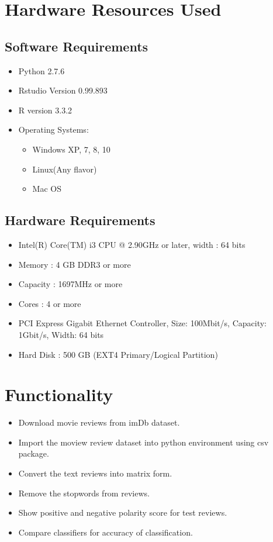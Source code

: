 \documentclass[oneside,a4paper,12pt]{pictreport}
\begin{document}
\section{Hardware Resources Used}
\subsection{Software Requirements}
\begin{itemize}
				\item Python 2.7.6 
				\item Rstudio Version 0.99.893 
				\item R version 3.3.2
				\item Operating Systems:
					\begin{itemize}
						\item Windows XP, 7, 8, 10
						\item Linux(Any flavor)
						\item Mac OS 
					\end{itemize}
\end{itemize}
\subsection{Hardware Requirements}
			\begin{itemize}
				\item Intel(R) Core(TM) i3 CPU @ 2.90GHz or later, width : 64 bits
				\item Memory : 4 GB DDR3 or more
				\item Capacity : 1697MHz or more
				\item Cores : 4 or more
				\item PCI Express Gigabit Ethernet Controller, Size: 100Mbit/s, Capacity: 1Gbit/s, Width: 64 bits
				\item Hard Disk : 500 GB (EXT4 Primary/Logical Partition)
			\end{itemize}
		
\newpage

\section{Functionality}
\begin{itemize}
\item Download movie reviews from imDb dataset.
\item Import the moview review dataset into python environment using csv package.

\item Convert the text reviews into matrix form.
\item Remove the stopwords from reviews.
\item Show positive and negative polarity score for test reviews.


\item Compare classifiers for accuracy of classification.
\end{itemize} 
\end{document}
